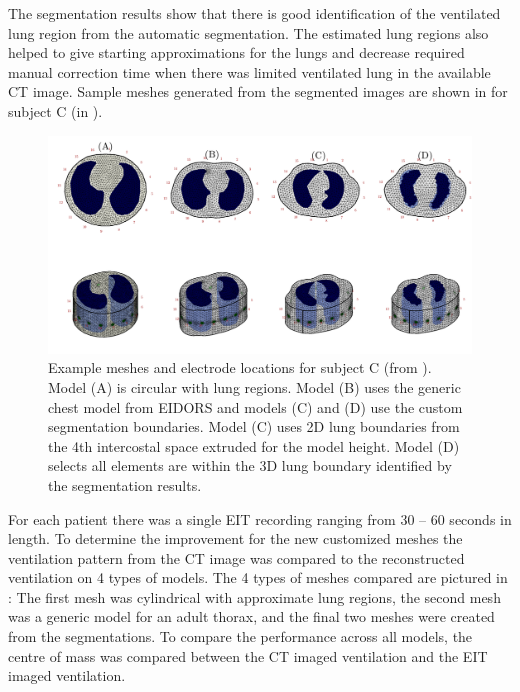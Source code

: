 The segmentation results show that there is good identification of the
ventilated lung region from the automatic segmentation. The estimated lung regions also helped to 
give starting approximations for the lungs and decrease required manual 
correction time when there was limited ventilated lung in the available CT image.
Sample meshes generated from the segmented images are shown in  
for subject C (in ).

\begin{figure}
	\centering
	\includegraphics[width=\textwidth]{chapter5-CT_to_mesh/imgs/fem_models_PT04.pdf}
	\caption[Custom and generic meshes]{\label{fig:fem-results}%
	Example meshes and electrode locations for subject C (from ).
	Model (A) is circular with lung regions. Model (B) uses the generic chest model from EIDORS 
	and models (C) and (D) use the custom segmentation boundaries. Model (C) uses 2D lung boundaries 
	from the 4th intercostal space extruded for the model height. Model (D) selects all elements
	are within the 3D lung boundary identified by the segmentation results.
	}
\end{figure}

For each patient there was a single EIT recording ranging from 30 -- 60 seconds in length.
To determine the improvement for the new customized meshes the ventilation pattern 
from the CT image was compared to the reconstructed ventilation on 4 types of models.
The 4 types of meshes compared are pictured in : The first mesh was
cylindrical with approximate lung regions, the second mesh was a generic model 
for an adult thorax, and the final two meshes were created from the segmentations. 
To compare the performance across all models, the centre of mass  was 
compared between the CT imaged ventilation and the EIT imaged ventilation.

